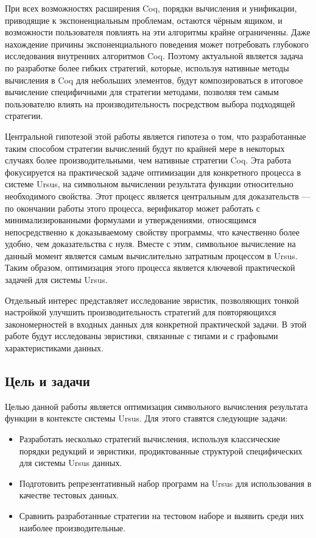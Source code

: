 \documentclass[../diploma.tex]{subfiles}
\begin{document}
При всех возможностях расширения Coq, порядки вычисления и унификации, приводящие к экспоненциальным проблемам, остаются чёрным ящиком, и возможности пользователя повлиять на эти алгоритмы крайне ограниченны. Даже нахождение причины экспоненциального поведения может потребовать глубокого исследования внутренних алгоритмов Coq. Поэтому актуальной является задача по разработке более гибких стратегий, которые, используя нативные методы вычисления в Coq для небольших элементов, будут композироваться в итоговое вычисление специфичными для стратегии методами, позволяя тем самым пользователю влиять на производительность посредством выбора подходящей стратегии.

Центральной гипотезой этой работы является гипотеза о том, что разработанные таким способом стратегии вычислений будут по крайней мере в некоторых случаях более производительными, чем нативные стратегии Coq. Эта работа фокусируется на практической задаче оптимизации для конкретного процесса в системе Ursus, на символьном вычислении результата функции относительно необходимого свойства. Этот процесс является центральным для доказательств --- по окончании работы этого процесса, верификатор может работать с минимализированными формулами и утверждениями, относящимся непосредственно к доказываемому свойству программы, что качественно более удобно, чем доказательства с нуля. Вместе с этим, символьное вычисление на данный момент является самым вычислительно затратным процессом в Ursus. Таким образом, оптимизация этого процесса является ключевой практической задачей для системы Ursus.

Отдельный интерес представляет исследование эвристик, позволяющих тонкой настройкой улучшить производительность стратегий для повторяющихся закономерностей в входных данных для конкретной практической задачи. В этой работе будут исследованы эвристики, связанные с типами и с графовыми характеристиками данных.

\subsection*{Цель и задачи}

Целью данной работы является оптимизация символьного вычисления результата функции в контексте системы Ursus. Для этого ставятся следующие задачи:

\begin{itemize}
	\item Разработать несколько стратегий вычисления, используя классические порядки редукций и эвристики, продиктованные структурой специфических для системы Ursus данных.
	\item Подготовить репрезентативный набор программ на Ursus для использования в качестве тестовых данных.
	\item Сравнить разработанные стратегии на тестовом наборе и выявить среди них наиболее производительные.
\end{itemize}
\end{document}
